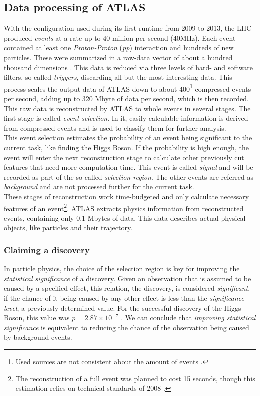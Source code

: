 \subsection{Data processing of ATLAS}
With the configuration used during its first runtime from 2009 to 2013, the LHC produced \emph{events} at a rate up to 40 million per second (40MHz). Each event contained at least one \emph{Proton-Proton} (\emph{pp}) interaction and hundreds of new particles. These were summarized in a raw-data vector of about a hundred thousand dimensions \cite{higgsPaper}. This data is reduced via three levels of hard- and software filters, so-called \emph{triggers}, discarding all but the most interesting data. This process scales the output data of ATLAS down to about 400\footnote{Used sources are not consistent about the amount of events \cite{higgsPaper, glig14, atlasHP}.} compressed events per second, adding up to 320 Mbyte of data per second, which is then recorded. This raw data is reconstructed by ATLAS to whole events in several stages. The first stage is called \emph{event selection}. In it, easily calculable information is derived from compressed events and is used to classify them for further analysis.\\
This event selection estimates the probability of an event being significant to the current task, like finding the Higgs Boson. 
If the probability is high enough, the event will enter the next reconstruction stage to calculate other previously cut features that need more computation time. This event is called \emph{signal} and will be recorded as part of the so-called \emph{selection region}. The other events are referred as \emph{background} and are not processed further for the current task.\\
These stages of reconstruction work time-budgeted and only calculate necessary features of an event\footnote{The reconstruction of a full event was planned to cost 15 seconds, though this estimation relies on technical standards of 2008 \cite{atlasHP}.}.
ATLAS extracts physics information from reconstructed events, containing only 0.1 Mbytes of data. This data describes actual physical objects, like particles and their trajectory.

\subsubsection{Claiming a discovery}
In particle physics, the choice of the selection region is key for improving the \emph{statistical significance} of a discovery. Given an observation that is assumed to be caused by a specified effect, this relation, the discovery, is considered \emph{significant}, if the chance of it being caused by any other effect is less than the \emph{significance level}, a previously determined value.
For the successful discovery of the Higgs Boson, this value was $p = 2.87 \times 10^{-7}$ \cite{higgsPaper}. We can conclude that \emph{improving statistical significance} is equivalent to reducing the chance of the observation being caused by background-events.

